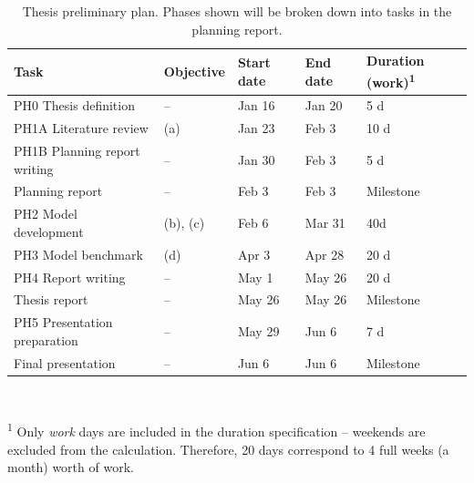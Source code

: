 \documentclass[a4paper,fontsize=10pt,bibliography=totoc]{scrartcl}
\begin{document}
\begin{table}[h!]
\centering
\footnotesize
\caption{Thesis preliminary plan. Phases shown will be broken down into tasks in the planning report.}
\label{t:schedule}
\begin{tabular}{lllll}
\toprule
Task & Objective & Start date & End date & Duration (work)\textsuperscript{1} \\
\midrule
PH0 Thesis definition & -- & Jan 16 & Jan 20 & 5 d \\
PH1A Literature review & (a) & Jan 23 & Feb 3 & 10 d \\
PH1B Planning report writing & -- & Jan 30 & Feb 3 & 5 d \\
Planning report & -- & Feb 3 & Feb 3 & Milestone \\
PH2 Model development & (b), (c) & Feb 6 & Mar 31 & 40d \\
PH3 Model benchmark & (d) & Apr 3 & Apr 28 & 20 d \\
PH4 Report writing & -- & May 1 & May 26 & 20 d \\
Thesis report & -- & May 26 & May 26 & Milestone \\
PH5 Presentation preparation & -- & May 29 & Jun 6 & 7 d \\
Final presentation & -- & Jun 6 & Jun 6 & Milestone \\
\bottomrule
\end{tabular}
{\\ \scriptsize \parbox{0.7\linewidth}{\textsuperscript{1} Only \textit{work} days are included in the duration specification -- weekends are excluded from the calculation. Therefore, 20 days correspond to 4 full weeks (a month) worth of work.}}
\end{table}
\end{document}
